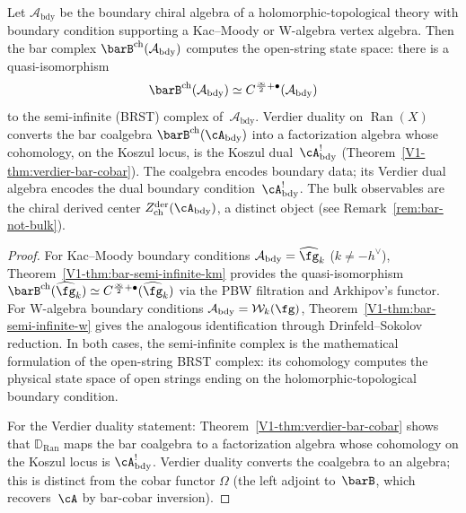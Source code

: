 \begin{theorem}
\label{thm:open-string-bar}
Let $\mathcal{A}_{\mathrm{bdy}}$ be the boundary chiral algebra of
a holomorphic-topological theory with boundary condition supporting
a Kac--Moody or W-algebra vertex algebra. Then the bar complex
$\barB^{\mathrm{ch}}(\mathcal{A}_{\mathrm{bdy}})$ computes the
open-string state space: there is a quasi-isomorphism
\[
\barB^{\mathrm{ch}}(\mathcal{A}_{\mathrm{bdy}})
\simeq
C^{\frac{\infty}{2}+\bullet}(\mathcal{A}_{\mathrm{bdy}})
\]
to the semi-infinite (BRST) complex of~$\mathcal{A}_{\mathrm{bdy}}$.
Verdier duality on $\operatorname{Ran}(X)$ converts the
bar coalgebra $\barB^{\mathrm{ch}}(\cA_{\mathrm{bdy}})$ into a
factorization algebra whose cohomology, on the Koszul locus, is the
Koszul dual~$\cA_{\mathrm{bdy}}^!$
\textup{(}Theorem~\textup{\ref*{V1-thm:verdier-bar-cobar})}.
The coalgebra encodes boundary data; its Verdier dual algebra
encodes the dual boundary condition~$\cA_{\mathrm{bdy}}^!$.
The bulk observables are the chiral derived center
$Z^{\mathrm{der}}_{\mathrm{ch}}(\cA_{\mathrm{bdy}})$, a distinct object
(see Remark~\ref{rem:bar-not-bulk}).
\end{theorem}

\begin{proof}
For Kac--Moody boundary conditions
$\mathcal{A}_{\mathrm{bdy}} = \widehat{\fg}_k$ ($k \neq -h^\vee$),
Theorem~\ref*{V1-thm:bar-semi-infinite-km} provides the quasi-isomorphism
$\barB^{\mathrm{ch}}(\widehat{\fg}_k) \simeq C^{\frac{\infty}{2}+\bullet}(\widehat{\fg}_k)$
via the PBW filtration and Arkhipov's functor.
For W-algebra boundary conditions
$\mathcal{A}_{\mathrm{bdy}} = \mathcal{W}_k(\fg)$,
Theorem~\ref*{V1-thm:bar-semi-infinite-w} gives the analogous
identification through Drinfeld--Sokolov reduction.
In both cases, the semi-infinite complex is the mathematical
formulation of the open-string BRST complex: its cohomology
computes the physical state space of open strings ending on
the holomorphic-topological boundary condition.

For the Verdier duality statement:
Theorem~\ref*{V1-thm:verdier-bar-cobar} shows that $\mathbb{D}_{\operatorname{Ran}}$
maps the bar coalgebra to a factorization algebra whose cohomology
on the Koszul locus is $\cA_{\mathrm{bdy}}^!$.
Verdier duality converts the coalgebra to an algebra; this is
distinct from the cobar functor $\Omega$ (the left adjoint to~$\barB$,
which recovers~$\cA$ by bar-cobar inversion).
\end{proof}

